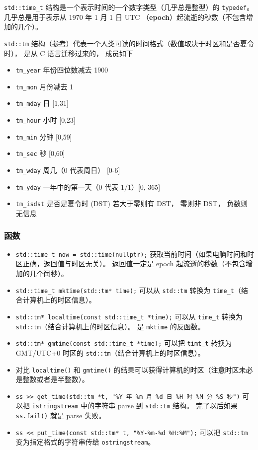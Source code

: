 
\begin{issues}
\issueDraft
\end{issues}


\verb`std::time_t` 结构是一个表示时间的一个数字类型（几乎总是整型）的 \verb`typedef`。 几乎总是用于表示从 1970 年 1 月 1 日 UTC （\textbf{epoch}）起流逝的秒数（不包含增加的几个）。

\verb`std::tm` 结构（\href{https://en.cppreference.com/w/cpp/chrono/c/tm}{参考}）代表一个人类可读的时间格式（数值取决于时区和是否夏令时）， 是从 C 语言迁移过来的， 成员如下
\begin{itemize}
\item \verb`tm_year` 年份四位数减去 1900
\item \verb`tm_mon` 月份减去 1
\item \verb`tm_mday` 日 [1,31]
\item \verb`tm_hour` 小时 [0,23]
\item \verb`tm_min` 分钟 [0,59]
\item \verb`tm_sec` 秒 [0,60]
\end{itemize}
\begin{itemize}
\item \verb`tm_wday` 周几（0 代表周日） [0-6]
\item \verb`tm_yday` 一年中的第一天（0 代表 1/1）[0, 365]
\item \verb`tm_isdst` 是否是夏令时 (DST) 若大于零则有 DST， 零则非 DST， 负数则无信息
\end{itemize}

\subsubsection{函数}
\begin{itemize}
\item \verb`std::time_t now = std::time(nullptr);` 获取当前时间（如果电脑时间和时区正确，返回值与时区无关）。 返回值一定是 epoch 起流逝的秒数（不包含增加的几个闰秒）。
\item \verb`std::time_t mktime(std::tm* time);` 可以从 \verb`std::tm` 转换为 \verb`time_t`（结合计算机上的时区信息）。
\item \verb`std::tm* localtime(const std::time_t *time);` 可以从 \verb`time_t` 转换为 \verb`std::tm`（结合计算机上的时区信息）。 是 \verb`mktime` 的反函数。
\item \verb`std::tm* gmtime(const std::time_t *time);` 可以把 \verb`timt_t` 转换为 GMT/UTC+0 时区的 \verb`std::tm`（结合计算机上的时区信息）。
\item 对比 \verb`localtime()` 和 \verb`gmtime()` 的结果可以获得计算机的时区（注意时区未必是整数或者是半整数）。
\item \verb`ss >> get_time(std::tm *t, "%Y 年 %m 月 %d 日 %H 时 %M 分 %S 秒")` 可以把 \verb`istringstream` 中的字符串 parse 到 \verb`std::tm` 结构。 完了以后如果 \verb`ss.fail()` 就是 parse 失败。
\item \verb`ss << put_time(const std::tm* t, "%Y-%m-%d %H:%M");` 可以把 \verb`std::tm` 变为指定格式的字符串传给 \verb`ostringstream`。
\end{itemize}
